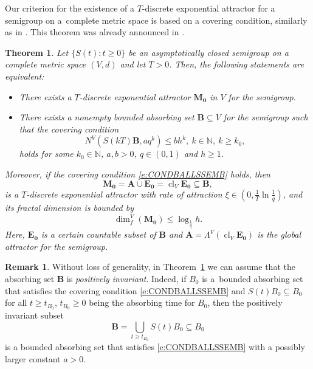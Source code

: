 \documentclass[a4paper,12pt,reqno]{amsart}
\theoremstyle{plain}
\newtheorem{thm}[lem]{Theorem}
\theoremstyle{definition}
\newtheorem{rem}[lem]{Remark}
\numberwithin{equation}{section}
\newcommand{\N}{\mathbb{N}}
\newcommand{\dimf}{\operatorname{dim}_{f}}
\newcommand{\cl}{\operatorname{cl}}
\renewcommand{\geq}{\geqslant}
\renewcommand{\leq}{\leqslant}
\begin{document}
Our criterion for the existence of a $T$-discrete exponential attractor for a semigroup on a~complete metric space is based on a covering condition, similarly as in \cite[Theorem 2.1]{Pra03b}. This theorem was already announced in \cite{CzKa}.


\begin{thm}\label{thm:EXDEXPAT}
Let $\{S(t)\colon t\geq 0\}$ be an asymptotically closed semigroup on a complete metric space $(V,d)$ and let $T>0$.
Then, the following statements are equivalent:
\begin{itemize}
\item[$(1)$] There exists a $T$-discrete exponential attractor $\mathbf{M_0}$ in $V$ for the semigroup.
\item[$(2)$] There exists a nonempty bounded 
absorbing set $\mathbf{B}\subseteq V$ for the semigroup
such that the covering condition 
\begin{equation}\label{e:CONDBALLSSEMB}
N^{V}(S(kT)\mathbf{B},aq^{k})\leq b h^{k},\ k\in\N,\ k\geq k_0,
\end{equation}
holds for some $k_0\in\N$, $a,b>0$, $q\in(0,1)$ and $h\geq 1$. 
\end{itemize}
Moreover, if the covering condition \eqref{e:CONDBALLSSEMB} holds, then
$$\mathbf{M_0}=\mathbf{A}\cup\mathbf{E_0}=\cl_{V}\mathbf{E_0}\subseteq \mathbf{B},$$
is a $T$-discrete exponential attractor with rate of attraction
$\xi\in(0,\frac{1}{T}\ln{\frac{1}{q}})$, and its fractal dimension is bounded by
\begin{equation}\label{e:ESTDIMM3}
\dimf^{V}(\mathbf{M_0})\leq\log_{\frac{1}{q}}h.
\end{equation}
Here, $\mathbf{E_0}$ is a certain countable subset of $\mathbf{B}$ and $\mathbf{A}=\Lambda^{V}(\cl_{V}\mathbf{E_0})$ is the global attractor for the semigroup.
\end{thm}


\begin{rem}\label{rem:POSINV}
Without loss of generality, in Theorem~\ref{thm:EXDEXPAT} we can assume that the absorbing set $\mathbf{B}$ is \emph{positively invariant}.
Indeed, if $B_0$ is a~bounded absorbing set that satisfies the covering condition \eqref{e:CONDBALLSSEMB} 
and $S(t)B_0\subseteq B_0$ for all $t\geq t_{B_0}$, $t_{B_0}\geq0$ being the absorbing time for $B_0$, then the positively invariant subset
\begin{equation*}
\mathbf{B}=\bigcup_{t\geq t_{B_0}}S(t)B_0\subseteq B_0
\end{equation*}
is a bounded absorbing set that satisfies \eqref{e:CONDBALLSSEMB} with a possibly  larger constant $a>0$.
\end{rem}
\end{document}
